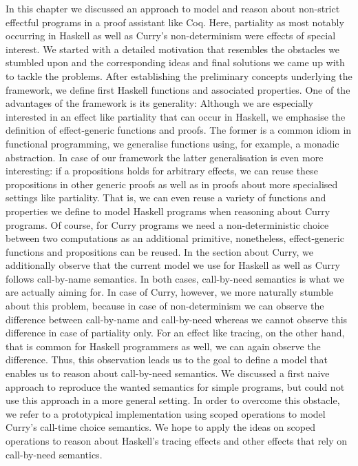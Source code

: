 In this chapter we discussed an approach to model and reason about non-strict effectful programs in a proof assistant like Coq.
Here, partiality as most notably occurring in Haskell as well as Curry's non-determinism were effects of special interest.
We started with a detailed motivation that resembles the obstacles we stumbled upon and the corresponding ideas and final solutions we came up with to tackle the problems.
After establishing the preliminary concepts underlying the  framework, we define first Haskell functions and associated properties.
One of the advantages of the framework is its generality: Although we are especially interested in an effect like partiality that can occur in Haskell, we emphasise the definition of effect-generic functions and proofs.
The former is a common idiom in functional programming, we generalise functions using, for example, a monadic abstraction.
In case of our framework the latter generalisation is even more interesting: if a propositions holds for arbitrary effects, we can reuse these propositions in other generic proofs as well as in proofs about more specialised settings like partiality.
That is, we can even reuse a variety of functions and properties we define to model Haskell programs when reasoning about Curry programs.
Of course, for Curry programs we need a non-deterministic choice between two computations as an additional primitive, nonetheless, effect-generic functions and propositions can be reused.
In the section about Curry, we additionally observe that the current model we use for Haskell as well as Curry follows call-by-name semantics.
In both cases, call-by-need semantics is what we are actually aiming for.
In case of Curry, however, we more naturally stumble about this problem, because in case of non-determinism we can observe the difference between call-by-name and call-by-need whereas we cannot observe this difference in case of partiality only.
For an effect like tracing, on the other hand, that is common for Haskell programmers as well, we can again observe the difference.
Thus, this observation leads us to the goal to define a model that enables us to reason about call-by-need semantics.
We discussed a first naive approach to reproduce the wanted semantics for simple programs, but could not use this approach in a more general setting.
In order to overcome this obstacle, we refer to a prototypical implementation using scoped operations to model Curry's call-time choice semantics.
We hope to apply the ideas on scoped operations to reason about Haskell's tracing effects and other effects that rely on call-by-need semantics.

